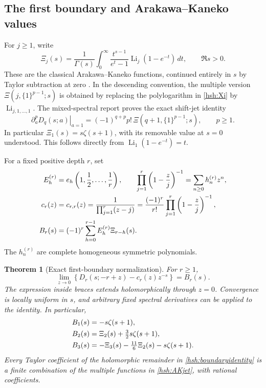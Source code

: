 \documentclass[11pt,a4paper]{article}
\numberwithin{equation}{section}
\newtheorem{theorem}{Theorem}[section]
\theoremstyle{definition}
\theoremstyle{remark}
\begin{document}
\subsection{The first boundary and Arakawa--Kaneko values}

For $j\geq1$, write
\begin{equation}\label{hsh:Xi}
 \Xi_j(s)=\frac1{\Gamma(s)}\int_0^\infty
   \frac{t^{s-1}}{e^t-1}\operatorname{Li}_j(1-e^{-t})\,dt,
 \qquad \Re s>0.
\end{equation}
These are the classical Arakawa--Kaneko functions, continued entirely
in $s$ by Taylor subtraction at zero
\cite{ArakawaKaneko,KanekoTsumura}.  In the descending convention,
the multiple version $\Xi(j,\{1\}^{p-1};s)$ is obtained by replacing
the polylogarithm in \eqref{hsh:Xi} by
$\operatorname{Li}_{j,1,\ldots,1}$.
The mixed-spectral report proves the exact shift-jet identity
\begin{equation}\label{hsh:AKjet}
 \left.\partial_a^pD_q(s;a)\right|_{a=1}
      =(-1)^{q+p}p!\,\Xi(q+1,\{1\}^{p-1};s),\qquad p\geq1.
\end{equation}
In particular $\Xi_1(s)=s\zeta(s+1)$, with its removable value
at $s=0$ understood.  This follows directly from
$\operatorname{Li}_1(1-e^{-t})=t$.

For a fixed positive depth $r$, set
\begin{align}
 E_h^{(r)}&=e_h\left(1,\frac12,\ldots,\frac1r\right),
 \qquad\prod_{j=1}^r\left(1-\frac zj\right)^{-1}
       =\sum_{n\geq0}h_n^{(r)}z^n,\label{hsh:eh}\\
 c_r(z)&=c_{r,r}(z)=\frac1{\prod_{j=1}^r(z-j)}
       =\frac{(-1)^r}{r!}\prod_{j=1}^r\left(1-\frac zj\right)^{-1},\notag\\
 B_r(s)&=(-1)^r\sum_{h=0}^{r-1}E_h^{(r)}\Xi_{r-h}(s).
                                                       \label{hsh:B}
\end{align}
The $h_n^{(r)}$ are complete homogeneous symmetric polynomials.

\begin{theorem}[Exact first-boundary normalization]\label{hsh:boundary}
For $r\geq1$,
\begin{equation}\label{hsh:boundaryidentity}
 \boxed{\displaystyle
 \lim_{z\to0}\left\{D_r(s;-r+z)-c_r(z)z^{-s}\right\}=B_r(s).}
\end{equation}
The expression inside braces extends holomorphically through $z=0$.
Convergence is locally uniform in $s$, and arbitrary fixed spectral
derivatives can be applied to the identity.  In particular,
\begin{align}
 B_1(s)&=-s\zeta(s+1),\notag\\
 B_2(s)&=\Xi_2(s)+\tfrac32s\zeta(s+1),\notag\\
 B_3(s)&=-\Xi_3(s)-\tfrac{11}{6}\Xi_2(s)-s\zeta(s+1).
                                                       \label{hsh:examples}
\end{align}
Every Taylor coefficient of the holomorphic remainder in
\eqref{hsh:boundaryidentity} is a finite combination of the multiple
functions in \eqref{hsh:AKjet}, with rational coefficients.
\end{theorem}
\end{document}
